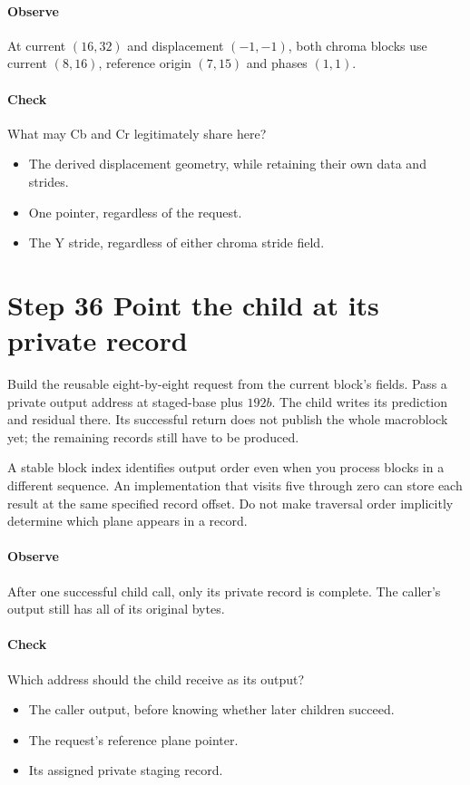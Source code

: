 \paragraph{Observe} At current $(16,32)$ and displacement $(-1,-1)$, both chroma
blocks use current $(8,16)$, reference origin $(7,15)$ and phases $(1,1)$.
\paragraph{Check} What may Cb and Cr legitimately share here?
\begin{itemize}
  \item[A.] The derived displacement geometry, while retaining their own data and strides.
  \item[B.] One pointer, regardless of the request.
  \item[C.] The Y stride, regardless of either chroma stride field.
\end{itemize}

\section{Step 36 Point the child at its private record}\label{h263-macroblock-s06}
Build the reusable eight-by-eight request from the current block's fields.
Pass a private output address at staged-base plus $192b$. The child writes its
prediction and residual there. Its successful return does not publish the whole
macroblock yet; the remaining records still have to be produced.

A stable block index identifies output order even when you process blocks in a
different sequence. An implementation that visits five through zero can store
each result at the same specified record offset. Do not make traversal order
implicitly determine which plane appears in a record.

\paragraph{Observe} After one successful child call, only its private record
is complete. The caller's output still has all of its original bytes.
\paragraph{Check} Which address should the child receive as its output?
\begin{itemize}
  \item[A.] The caller output, before knowing whether later children succeed.
  \item[B.] The request's reference plane pointer.
  \item[C.] Its assigned private staging record.
\end{itemize}

